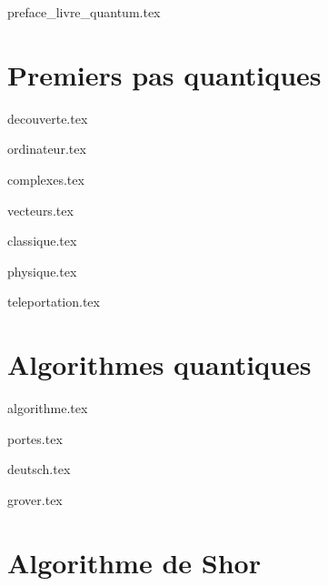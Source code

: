 \documentclass[11pt]{report}
\begin{document}
\renewcommand{\contentsname}{Sommaire}

{preface_livre_quantum.tex}
\debutchapitres
{}


\clearemptydoublepage


\part{Premiers pas quantiques}

{decouverte.tex}

{ordinateur.tex}

{complexes.tex}

{vecteurs.tex}

{classique.tex}

{physique.tex}

{teleportation.tex}


\part{Algorithmes quantiques}

{algorithme.tex}

{portes.tex}

{deutsch.tex}

{grover.tex}


\part{Algorithme de Shor}
\end{document}
